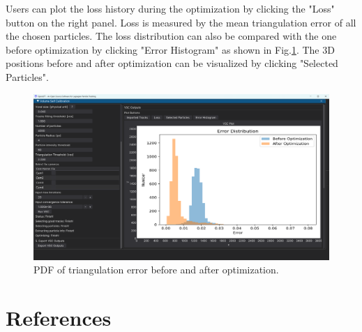 \documentclass[a4paper,fleqn]{article}
\begin{document}
\begin{enumerate}
    Users can plot the loss history during the optimization by clicking the "Loss" button on the right panel. Loss is measured by the mean triangulation error of all the chosen particles. The loss distribution can also be compared with the one before optimization by clicking "Error Histogram" as shown in Fig.\ref{fig:GUI_VSC_errhist}. The 3D positions before and after optimization can be visualized by clicking "Selected Particles". 

    \begin{figure}[h]
        \centering
        \includegraphics[width=\linewidth]{Fig/GUI_VSC_errhist.png}
        \caption{PDF of triangulation error before and after optimization.}
        \label{fig:GUI_VSC_errhist}
    \end{figure}
    
    
\end{enumerate}




\section{References}


\end{document}
